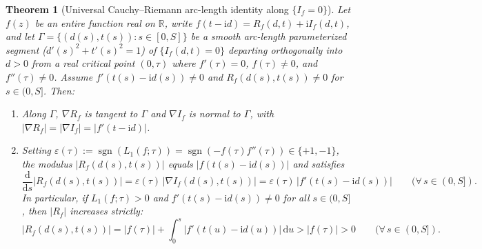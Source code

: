 \documentclass[11pt,a4paper,reqno]{amsart}
\newtheorem{theorem}{Theorem}[section]
\theoremstyle{definition}
\theoremstyle{remark}
\numberwithin{equation}{section}
\newcommand{\dd}{\mathrm{d}}
\newcommand{\ii}{\mathrm{i}}
\begin{document}
\begin{theorem}[Universal Cauchy--Riemann arc-length identity along $\{I_f = 0\}$]\label{thm:cr_monotonicity}
Let $f(z)$ be an entire function real on $\mathbb{R}$, write $f(t-\ii d) = R_f(d,t) + \ii I_f(d,t)$, and let $\Gamma = \{(d(s), t(s)) : s \in [0, S]\}$ be a smooth arc-length parameterized segment ($d'(s)^2 + t'(s)^2 = 1$) of $\{I_f(d,t) = 0\}$ departing orthogonally into $d > 0$ from a real critical point $(0, \tau)$ where $f'(\tau) = 0$, $f(\tau) \neq 0$, and $f''(\tau) \neq 0$. Assume $f'(t(s) - \ii d(s)) \neq 0$ and $R_f(d(s), t(s)) \neq 0$ for $s \in (0, S]$. Then:
\begin{enumerate}
\item[\textup{(a)}] Along $\Gamma$, $\nabla R_f$ is tangent to $\Gamma$ and $\nabla I_f$ is normal to $\Gamma$, with $|\nabla R_f| = |\nabla I_f| = |f'(t-\ii d)|$.
\item[\textup{(b)}] Setting $\varepsilon(\tau) := \operatorname{sgn}(L_1(f;\tau)) = \operatorname{sgn}(-f(\tau)f''(\tau)) \in \{+1, -1\}$, the modulus $|R_f(d(s),t(s))|$ equals $|f(t(s)-\ii d(s))|$ and satisfies
\begin{equation}\label{eq:dabsR_ds}
\frac{\dd}{\dd s}\big|R_f(d(s), t(s))\big| = \varepsilon(\tau)\,\big|\nabla I_f(d(s), t(s))\big| = \varepsilon(\tau)\,\big|f'(t(s) - \ii d(s))\big| \qquad (\forall\, s \in (0, S]).
\end{equation}
In particular, if $L_1(f;\tau) > 0$ and $f'(t(s)-\ii d(s)) \neq 0$ for all $s \in (0, S]$, then $|R_f|$ increases strictly:
\begin{equation}\label{eq:absR_integral_growth}
\big|R_f(d(s), t(s))\big| = \big|f(\tau)\big| + \int_0^s \big|f'(t(u) - \ii d(u))\big|\,\dd u > \big|f(\tau)\big| > 0 \qquad (\forall\, s \in (0, S]).
\end{equation}
\end{enumerate}
\end{theorem}
\end{document}
